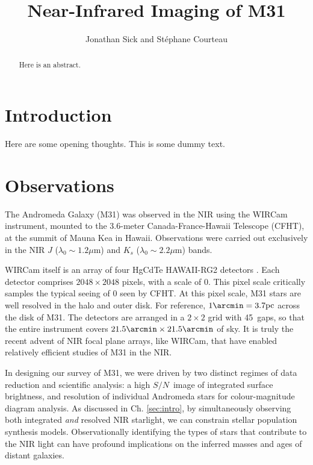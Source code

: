 \documentclass[iop]{emulateapj}
\newcommand{\sn}{\ensuremath{S/N}} %
\begin{document}
\title{Near-Infrared Imaging of M31}
\author{Jonathan Sick and Stéphane Courteau}

\begin{abstract}
Here is an abstract.
\end{abstract}

\section{Introduction}

Here are some opening thoughts. This is some dummy text.

\section{Observations} %
\label{sec:Observations}

The Andromeda Galaxy (M31) was observed in the NIR using the WIRCam instrument, mounted to the 3.6-meter Canada-France-Hawaii Telescope (CFHT), at the summit of Mauna Kea in Hawaii. Observations were carried out exclusively in the NIR $J$ ($\lambda_0 \sim 1.2 \mu\mathrm{m}$) and $K_s$ ($\lambda_0 \sim 2.2 \mu\mathrm{m}$) bands.

WIRCam itself is an array of four HgCdTe HAWAII-RG2 detectors \citep{Puget:2004}. Each detector comprises $2048\times 2048$ pixels, with a scale of 0. This pixel scale critically samples the typical seeing of 0 seen by CFHT. At this pixel scale, M31 stars are well resolved in the halo and outer disk. For reference, $1\arcmin = 3.7\mathrm{pc}$ across the disk of M31. The detectors are arranged in a $2\times 2$ grid with 45\arcsec\ gaps, so that the entire instrument covers $21.5\arcmin \times 21.5\arcmin$ of sky. It is truly the recent advent of NIR focal plane arrays, like WIRCam, that have enabled relatively efficient studies of M31 in the NIR.

In designing our survey of M31, we were driven by two distinct regimes of data reduction and scientific analysis: a high \sn\ image of integrated surface brightness, and resolution of individual Andromeda stars for colour-magnitude diagram analysis. As discussed in Ch. \ref{sec:intro}, by simultaneously observing both integrated \emph{and} resolved NIR starlight, we can constrain stellar population synthesis models. Observationally identifying the types of stars that contribute to the NIR light can have profound implications on the inferred masses and ages of distant galaxies.
\end{document}
